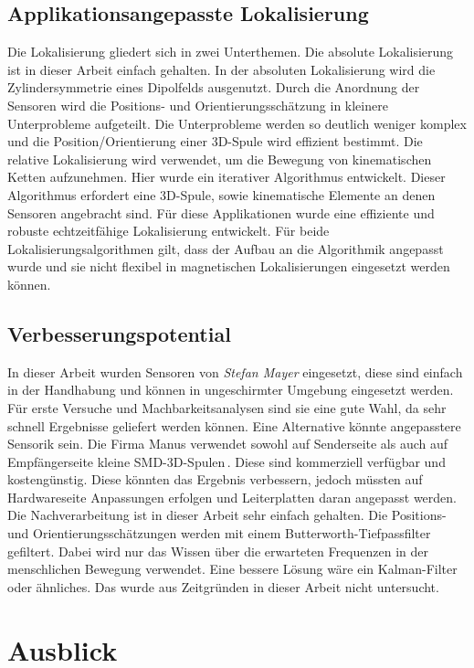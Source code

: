    \subsection{Applikationsangepasste Lokalisierung}
   Die Lokalisierung gliedert sich in zwei Unterthemen. Die absolute Lokalisierung ist in dieser Arbeit einfach gehalten. In der absoluten Lokalisierung wird die Zylindersymmetrie eines Dipolfelds ausgenutzt. Durch die Anordnung der Sensoren wird die Positions- und Orientierungsschätzung in kleinere Unterprobleme aufgeteilt. Die Unterprobleme werden so deutlich weniger komplex und die Position/Orientierung einer 3D-Spule wird effizient bestimmt.
   Die relative Lokalisierung wird verwendet, um die Bewegung von kinematischen Ketten aufzunehmen. Hier wurde ein iterativer Algorithmus entwickelt. Dieser Algorithmus erfordert eine 3D-Spule, sowie kinematische Elemente an denen Sensoren angebracht sind. Für diese Applikationen wurde eine effiziente und robuste echtzeitfähige Lokalisierung entwickelt.
   Für beide Lokalisierungsalgorithmen gilt, dass der Aufbau an die Algorithmik angepasst wurde und sie nicht flexibel in magnetischen Lokalisierungen eingesetzt werden können.

   \subsection{Verbesserungspotential}
   In dieser Arbeit wurden Sensoren von \textit{Stefan Mayer} eingesetzt, diese sind einfach in der Handhabung und können in ungeschirmter Umgebung eingesetzt werden. Für erste Versuche und Machbarkeitsanalysen sind sie eine gute Wahl, da sehr schnell Ergebnisse geliefert werden können. Eine Alternative könnte angepasstere Sensorik sein. Die Firma Manus verwendet sowohl auf Senderseite als auch auf Empfängerseite kleine SMD-3D-Spulen\,\cite{saggio_quasi-static_2025}. Diese sind kommerziell verfügbar und kostengünstig. Diese könnten das Ergebnis verbessern, jedoch müssten auf Hardwareseite Anpassungen erfolgen und Leiterplatten daran angepasst werden.
   Die Nachverarbeitung ist in dieser Arbeit sehr einfach gehalten. Die Positions- und Orientierungsschätzungen werden mit einem Butterworth-Tiefpassfilter gefiltert. Dabei wird nur das Wissen über die erwarteten Frequenzen in der menschlichen Bewegung verwendet. Eine bessere Lösung wäre ein Kalman-Filter oder ähnliches. Das wurde aus Zeitgründen in dieser Arbeit nicht untersucht.

   \section{Ausblick}

